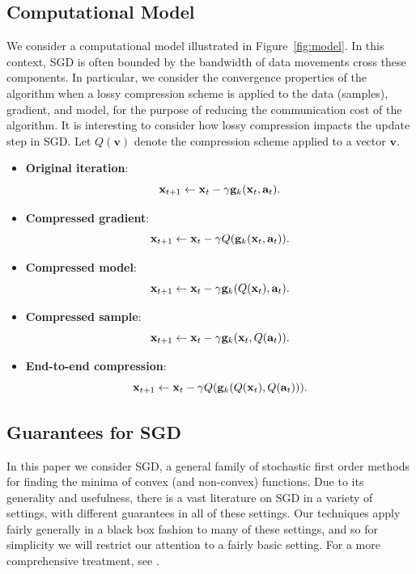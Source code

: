 \documentclass{article}
\renewcommand{\vec}[1]{\mathbf{#1}}
\def\g{{\bf g}}
\def\x{{\bf x}}
\begin{document}
\subsection{Computational Model}

We consider a computational model illustrated in
Figure~\ref{fig:model}.  
In this context, SGD is often bounded by the bandwidth
of data movements cross these components. 
In particular, we consider the convergence properties of the algorithm when a lossy compression scheme is applied to the data (samples), 
gradient, and model, for the purpose of reducing the communication cost of the algorithm. 
It is interesting to consider how lossy compression impacts the update step in SGD. Let $Q( \vec{v} )$ denote the compression scheme applied to a vector $\vec{v}$. 

\begin{itemize}
    \item \textbf{Original iteration}: $$\x_{t + 1} \leftarrow \x_t - \gamma \g_k (\x_t, \vec{a}_t).$$
    \item \textbf{Compressed gradient}: $$\x_{t + 1} \leftarrow \x_t - \gamma Q( \g_k (\x_t, \vec{a}_t) ).$$
    \item \textbf{Compressed model}: $$\x_{t + 1} \leftarrow \x_t - \gamma \g_k (Q(\x_t), \vec{a}_t).$$
    \item \textbf{Compressed sample}: $$\x_{t + 1} \leftarrow \x_t - \gamma \g_k (\x_t, Q(\vec{a}_t)).$$
    \item \textbf{End-to-end compression}: $$\x_{t + 1} \leftarrow \x_t - \gamma Q(\g_k (Q(\x_t), Q(\vec{a}_t))).$$
\end{itemize}














%   
%    

\subsection{Guarantees for SGD}
In this paper we consider SGD, a general family of stochastic first order methods for finding the minima of convex (and non-convex) functions.
Due to its generality and usefulness, there is a vast literature on SGD in a variety of settings, with different guarantees in all of these settings.
Our techniques apply fairly generally in a black box fashion to many of these settings, and so for simplicity we will restrict our attention to a fairly basic setting.
For a more comprehensive treatment, see \cite{bubeck2015convex}.
\end{document}
